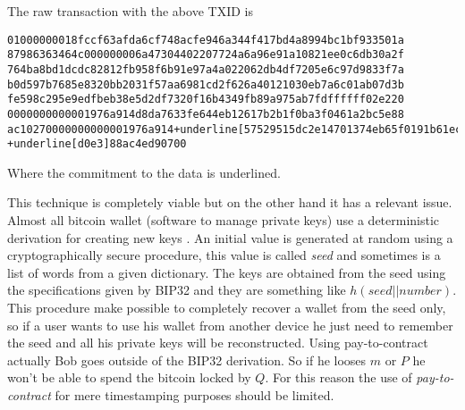 The raw transaction with the above TXID is 
\begin{Verbatim}[commandchars=+\[\], frame=single]
01000000018fccf63afda6cf748acfe946a344f417bd4a8994bc1bf933501a
87986363464c000000006a47304402207724a6a96e91a10821ee0c6db30a2f
764ba8bd1dcdc82812fb958f6b91e97a4a022062db4df7205e6c97d9833f7a
b0d597b7685e8320bb2031f57aa6981cd2f626a40121030eb7a6c01ab07d3b
fe598c295e9edfbeb38e5d2df7320f16b4349fb89a975ab7fdffffff02e220
0000000000001976a914d8da7633fe644eb12617b2b1f0ba3f0461a2bc5e88
ac10270000000000001976a914+underline[57529515dc2e14701374eb65f0191b61ecfd]
+underline[d0e3]88ac4ed90700
\end{Verbatim}
Where the commitment to the data is underlined.

This technique is completely viable but on the other hand it has a relevant issue.
Almost all bitcoin wallet (software to manage private keys) use a deterministic derivation for creating new keys \cite{BIP32}. An initial value is generated at random using a cryptographically secure procedure, this value is called \textit{seed} and sometimes is a list of words from a given dictionary. The keys are obtained from the seed using the specifications given by BIP32 and they are something like $h(seed||number)$. This procedure make possible to completely recover a wallet from the seed only, so if a user wants to use his wallet from another device he just need to remember the seed and all his private keys will be reconstructed.
Using pay-to-contract actually Bob goes outside of the BIP32 derivation. So if he looses $m$ or $P$ he won't be able to spend the bitcoin locked by $Q$. For this reason the use of \textit{pay-to-contract} for mere timestamping purposes should be limited.

